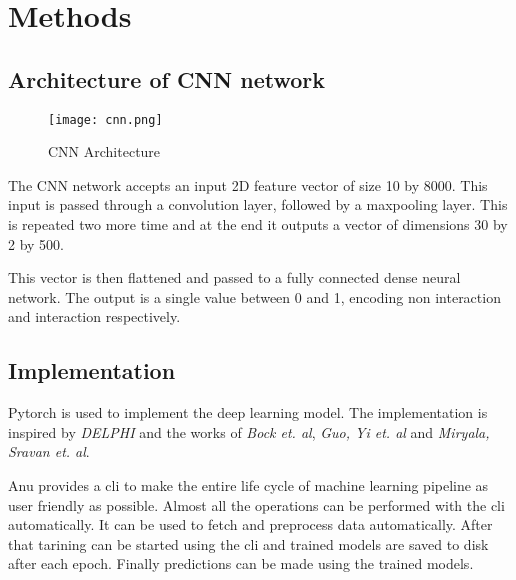 \documentclass[../main.tex]{subfiles}
\begin{document}
\section{Methods}

\subsection{Architecture of CNN network}
\begin{figure}[H]
  \centering
  \texttt{[image: cnn.png]}
  \caption{CNN Architecture}
\end{figure}
The CNN network accepts an input 2D feature vector of size 10 by 8000.
This input is passed through a convolution layer, followed by a maxpooling layer.
This is repeated two more time and at the end it outputs a vector of dimensions 30 by 2 by 500.

This vector is then flattened and passed to a fully connected dense neural network.
The output is a single value between 0 and 1, encoding non interaction and interaction respectively.

\subsection{Implementation}
Pytorch is used to implement the deep learning model.
The implementation is inspired by \emph{DELPHI}
and the works of \emph{Bock et. al}, \emph{Guo, Yi et. al}
and \emph{Miryala, Sravan et. al}.

Anu provides a cli to make the entire life cycle of machine learning pipeline as user friendly as possible.
Almost all the operations can be performed with the cli automatically.
It can be used to fetch and preprocess data automatically.
After that tarining can be started using the cli and trained models are saved to disk after each epoch.
Finally predictions can be made using the trained models.
\end{document}
